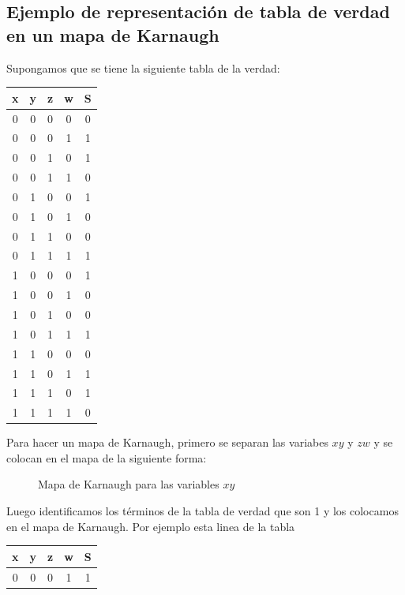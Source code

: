 \documentclass{article}
\begin{document}
\subsection*{Ejemplo de representación de tabla de verdad en un mapa de Karnaugh}
Supongamos que se tiene la siguiente tabla de la verdad:

\begin{table}[h]
    \centering
    \begin{tabular}{ccccc}
        \toprule
        \textbf{x} & \textbf{y} & \textbf{z} & \textbf{w} & \textbf{S}\\
        \midrule
        0 & 0 & 0 & 0 & 0\\
        0 & 0 & 0 & 1 & 1\\
        0 & 0 & 1 & 0 & 1\\
        0 & 0 & 1 & 1 & 0\\
        0 & 1 & 0 & 0 & 1\\
        0 & 1 & 0 & 1 & 0\\
        0 & 1 & 1 & 0 & 0\\
        0 & 1 & 1 & 1 & 1\\
        1 & 0 & 0 & 0 & 1\\
        1 & 0 & 0 & 1 & 0\\
        1 & 0 & 1 & 0 & 0\\
        1 & 0 & 1 & 1 & 1\\
        1 & 1 & 0 & 0 & 0\\
        1 & 1 & 0 & 1 & 1\\
        1 & 1 & 1 & 0 & 1\\
        1 & 1 & 1 & 1 & 0\\
        \bottomrule
    \end{tabular}
\end{table}
Para hacer un mapa de Karnaugh, primero se separan las variabes $xy$ y $zw$ y se colocan en el mapa de la siguiente forma:

\begin{figure}[h]
    \centering
    \begin{karnaugh-map}[4][4][1][$w$][$z$][$y$][$x$]
        \autoterms[-]
    \end{karnaugh-map}
    \caption{Mapa de Karnaugh para las variables $xy$}
\end{figure}

\newpage
Luego identificamos los términos de la tabla de verdad que son 1 y los colocamos en el mapa de Karnaugh.
\newline Por ejemplo esta linea de la tabla
\begin{table}[h]
    \centering
    \begin{tabular}{ccccc}
        \toprule
        \textbf{x} & \textbf{y} & \textbf{z} & \textbf{w} & \textbf{S}\\
        \midrule
        0 & 0 & 0 & 1 & 1\\
        \bottomrule
    \end{tabular}
\end{table}
\end{document}

